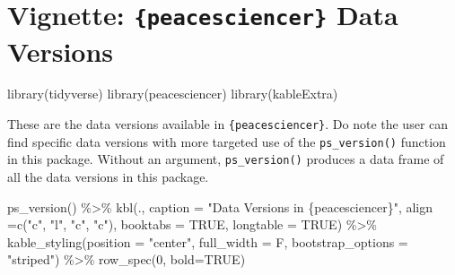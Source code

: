 \documentclass[
  11pt,
]{article}
\newenvironment{Shaded}{\begin{snugshade}}{\end{snugshade}}
\newcommand{\AttributeTok}[1]{\textcolor[rgb]{0.77,0.63,0.00}{#1}}
\newcommand{\ConstantTok}[1]{\textcolor[rgb]{0.00,0.00,0.00}{#1}}
\newcommand{\DecValTok}[1]{\textcolor[rgb]{0.00,0.00,0.81}{#1}}
\newcommand{\FunctionTok}[1]{\textcolor[rgb]{0.00,0.00,0.00}{#1}}
\newcommand{\NormalTok}[1]{#1}
\newcommand{\SpecialCharTok}[1]{\textcolor[rgb]{0.00,0.00,0.00}{#1}}
\newcommand{\StringTok}[1]{\textcolor[rgb]{0.31,0.60,0.02}{#1}}
\begin{document}
\hypertarget{vignette-peacesciencer-data-versions}{%
\section{\texorpdfstring{Vignette: \texttt{\{peacesciencer\}} Data Versions}{Vignette: \{peacesciencer\} Data Versions}}\label{vignette-peacesciencer-data-versions}}

\begin{Shaded}
\begin{Highlighting}[]
\FunctionTok{library}\NormalTok{(tidyverse)}
\FunctionTok{library}\NormalTok{(peacesciencer)}
\FunctionTok{library}\NormalTok{(kableExtra)}
\end{Highlighting}
\end{Shaded}

These are the data versions available in \texttt{\{peacesciencer\}}. Do note the user can find specific data versions with more targeted use of the \texttt{ps\_version()} function in this package. Without an argument, \texttt{ps\_version()} produces a data frame of all the data versions in this package.

\begin{Shaded}
\begin{Highlighting}[]
\FunctionTok{ps\_version}\NormalTok{() }\SpecialCharTok{\%\textgreater{}\%}
  \FunctionTok{kbl}\NormalTok{(., }\AttributeTok{caption =} \StringTok{"Data Versions in \textasciigrave{}\{peacesciencer\}\textasciigrave{}"}\NormalTok{,}
      \AttributeTok{align =}\FunctionTok{c}\NormalTok{(}\StringTok{"c"}\NormalTok{, }\StringTok{"l"}\NormalTok{, }\StringTok{"c"}\NormalTok{, }\StringTok{"c"}\NormalTok{), }
      \AttributeTok{booktabs =} \ConstantTok{TRUE}\NormalTok{, }\AttributeTok{longtable =} \ConstantTok{TRUE}\NormalTok{)  }\SpecialCharTok{\%\textgreater{}\%}
  \FunctionTok{kable\_styling}\NormalTok{(}\AttributeTok{position =} \StringTok{"center"}\NormalTok{, }\AttributeTok{full\_width =}\NormalTok{ F, }
                \AttributeTok{bootstrap\_options =} \StringTok{"striped"}\NormalTok{) }\SpecialCharTok{\%\textgreater{}\%}
  \FunctionTok{row\_spec}\NormalTok{(}\DecValTok{0}\NormalTok{, }\AttributeTok{bold=}\ConstantTok{TRUE}\NormalTok{)}
\end{Highlighting}
\end{Shaded}
\end{document}
